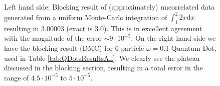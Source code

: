 \begin{figure}
 \begin{center}
  \caption{Left hand side: Blocking result of (approximately) uncorrelated data generated from a uniform Monte-Carlo integration of $\int _1^2 2x\mathrm{d}x$ resulting in $3.00003$ (exact is $3.0$). This is in excellent agreement with the magnitude of the error $\sim 9\cdot 10^{-5}$. On the right hand side we have the blocking result (DMC) for 6-particle $\omega=0.1$ Quantum Dot, used in Table \ref{tab:QDotsResultsAll}. We clearly see the plateau discussed in the blocking section, resulting in a total error in the range of $4.5\cdot 10^{-5}$ to $5\cdot 10^{-5}$.}
  \label{FIG:BlockingExamples}
 \end{center}
\end{figure}


